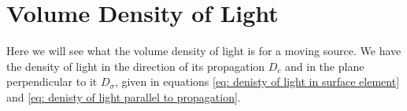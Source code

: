
\section{Volume Density of Light}\label{sect: Field Scalar Density}






Here we will see what the volume density of light is for a moving source.
We have the density of light in the direction of its propagation $D_{c}$ and in the plane perpendicular to it $D_{\sigma}$, given in equations \eqref{eq: denisty of light in surface element} and \eqref{eq: denisty of light parallel to propagation}.


